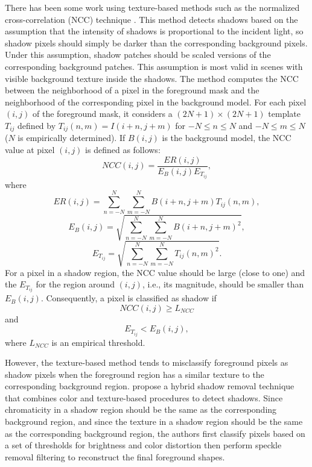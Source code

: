 There has been some work using texture-based methods such as the
normalized cross-correlation (NCC)
technique . This method
detects shadows based on the assumption that the intensity of shadows
is proportional to the incident light, so shadow pixels should simply
be darker than the corresponding background pixels. Under this
assumption, shadow patches should be scaled versions of the
corresponding background patches. This assumption is most valid in
scenes with visible background texture inside the shadows. The method
computes the NCC between the neighborhood of a pixel in the foreground
mask and the neighborhood of the corresponding pixel in the background
model.  For each pixel $(i, j)$ of the foreground mask, it considers a
$(2N + 1)
\times (2N + 1)$ template $T_{ij}$ defined by $T_{ij}(n, m) = I(i+n,
j+m)$ for $-N \le n \le N$ and $-N \le m \le N$ ($N$ is empirically
determined). If $B(i, j)$ is the background model, the NCC value at
pixel $(i, j)$ is defined as follows:
\[
  NCC(i,j) = \frac{{ER(i,j)}}{{E_B (i,j)E_{T_{ij} } }},
\]
where
\[
  ER(i,j) = \sum\limits_{n = -N}^N {\sum\limits_{m = -N}^N {B(i + n,j
  + m)T_{ij} (n,m)}},
\]
\[
  E_B (i,j) = \sqrt {\sum\limits_{n = -N}^N {\sum\limits_{m = -N}^N
  {B(i + n,j + m)^2}}},
\]
\[
  E_{T_{ij} } = \sqrt {\sum\limits_{n = -N}^N {\sum\limits_{m = -N}^N
  {T_{ij} (n,m)^2}}}.
\]
For a pixel in a shadow region, the NCC value should be large (close
to one) and the $E_{T_{ij}}$ for the region around $(i,j)$, i.e., its
magnitude, should be smaller than $E_B (i,j)$. Consequently, a pixel
is classified as shadow if
\[
  NCC(i,j) \ge L_{NCC} 
\]
and
\[
  E_{T_{ij}} < E_B (i,j),
\]
where $L_{NCC}$ is an empirical threshold.

However, the texture-based method tends to misclassify foreground
pixels as shadow pixels when the foreground region has a similar
texture to the corresponding background
region.  propose a hybrid shadow removal
technique that combines color and texture-based procedures to detect
shadows.  Since chromaticity in a shadow region should be the same as
the corresponding background region, and since the texture in a shadow
region should be the same as the corresponding background region, the
authors first classify pixels based on a set of thresholds for
brightness and color distortion then perform speckle removal filtering
to reconstruct the final foreground shapes.

